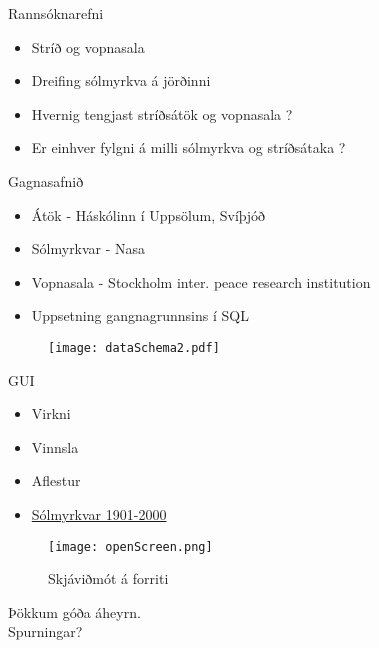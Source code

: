 \documentclass{rubeamer}
\begin{document}
\rutitleframe{}


\begin{frame}{Rannsóknarefni}
	\begin{itemize}
		\item Stríð og vopnasala 
		\item Dreifing sólmyrkva á jörðinni
		\item Hvernig tengjast stríðsátök og vopnasala ?
		\item Er einhver fylgni á milli sólmyrkva og stríðsátaka ?
		
	\end{itemize}
\end{frame}

\begin{frame}{Gagnasafnið}
	
	\begin{itemize}
		\item Átök - Háskólinn í Uppsölum, Svíþjóð \cite{conflict}
		\item Sólmyrkvar - Nasa \cite{Eclipse}
		\item Vopnasala - Stockholm inter. peace research institution \cite{weapon}
		\item Uppsetning gangnagrunnsins í SQL
	\end{itemize}
	
	\begin{figure}
		\centering
		\texttt{[image: dataSchema2.pdf]}
	\end{figure}
\end{frame}

\begin{frame}{GUI}
	\begin{itemize}
		\item Virkni \cite{qt4} \cite{basemap}
		\item Vinnsla \cite{Qdarkstyle}
		\item Aflestur
		\item \href{file:///C:/haukur/skoli/5.onn/gagnavinnsla/Gagnavinnsla.git/trunk/lokaverkefni/kynning/graphics/SpinningGlobe.gif}{Sólmyrkvar 1901-2000} \cite{moviepy}
	\end{itemize}
	\begin{figure}
		\centering
		\texttt{[image: openScreen.png]}
		\caption*{Skjáviðmót á forriti}
	\end{figure}
\end{frame}

	
\begin{frame}
	\centering
	Þökkum góða áheyrn. \\
	Spurningar?\\
\end{frame}

\bibframe
\end{document}

